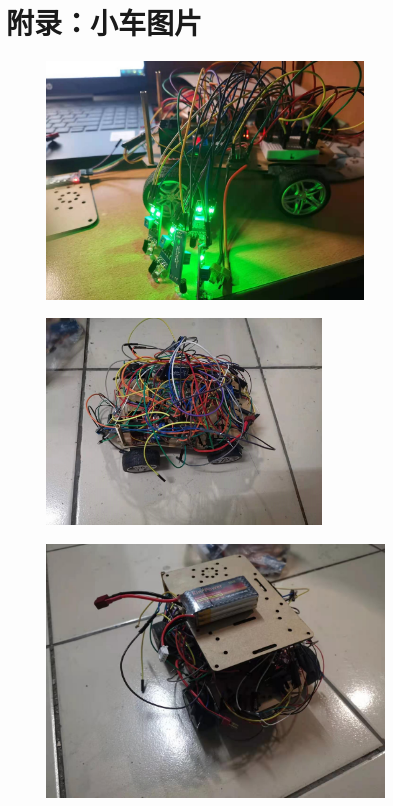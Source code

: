 \documentclass[UTF8]{ctexart}
\begin{document}
\section{附录：小车图片}
\begin{figure}[H]
\centering
\includegraphics[width=0.75\textwidth]{1.jpg}
\end{figure}
\begin{figure}[H]
\centering
\includegraphics[width=0.65\textwidth]{2.jpg}
\end{figure}
\begin{figure}[H]
\centering
\includegraphics[width=0.8\textwidth]{3.jpg}
\end{figure}
\end{document}
